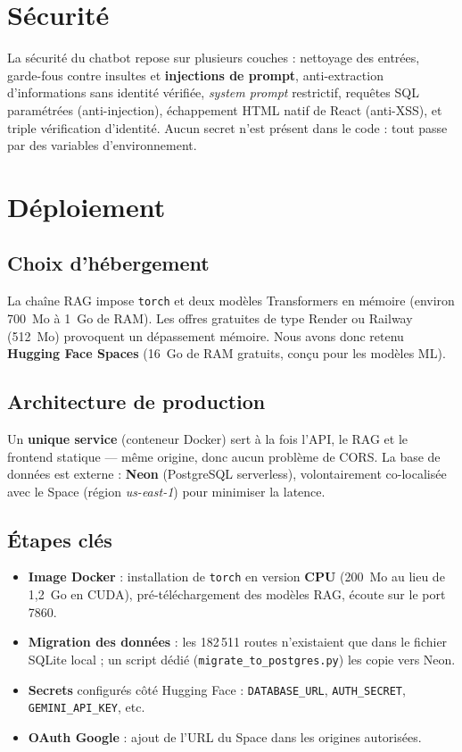 \documentclass[11pt,a4paper]{article}
\newcommand{\code}[1]{\texttt{\small #1}}
\begin{document}
\section{Sécurité}
La sécurité du chatbot repose sur plusieurs couches : nettoyage des entrées, garde-fous
contre insultes et \textbf{injections de prompt}, anti-extraction d'informations sans
identité vérifiée, \emph{system prompt} restrictif, requêtes SQL paramétrées
(anti-injection), échappement HTML natif de React (anti-XSS), et triple vérification
d'identité. Aucun secret n'est présent dans le code : tout passe par des variables
d'environnement.

\section{Déploiement}

\subsection{Choix d'hébergement}
La chaîne RAG impose \code{torch} et deux modèles Transformers en mémoire
(environ 700~Mo à 1~Go de RAM). Les offres gratuites de type Render ou Railway
(512~Mo) provoquent un dépassement mémoire. Nous avons donc retenu \textbf{Hugging Face
Spaces} (16~Go de RAM gratuits, conçu pour les modèles ML).

\subsection{Architecture de production}
Un \textbf{unique service} (conteneur Docker) sert à la fois l'API, le RAG et le
frontend statique --- même origine, donc aucun problème de CORS. La base de données est
externe : \textbf{Neon} (PostgreSQL serverless), volontairement co-localisée avec le
Space (région \emph{us-east-1}) pour minimiser la latence.

\subsection{Étapes clés}
\begin{itemize}[nosep]
  \item \textbf{Image Docker} : installation de \code{torch} en version \textbf{CPU}
        (200~Mo au lieu de 1,2~Go en CUDA), pré-téléchargement des modèles RAG, écoute
        sur le port 7860.
  \item \textbf{Migration des données} : les 182\,511 routes n'existaient que dans le
        fichier SQLite local ; un script dédié (\code{migrate\_to\_postgres.py}) les
        copie vers Neon.
  \item \textbf{Secrets} configurés côté Hugging Face : \code{DATABASE\_URL},
        \code{AUTH\_SECRET}, \code{GEMINI\_API\_KEY}, etc.
  \item \textbf{OAuth Google} : ajout de l'URL du Space dans les origines autorisées.
\end{itemize}
\end{document}
